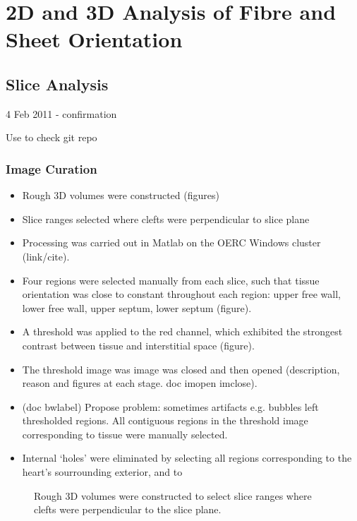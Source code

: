 \chapter{2D and 3D Analysis of Fibre and Sheet Orientation}
\dblspace
\begin{quote}{\em }\end{quote}

\section{Slice Analysis} %
\label{sec:image:slice_analysis}

4 Feb  2011 - confirmation

Use to check git repo

\subsection{Image Curation} %
\label{sub:image_curation}
\begin{itemize}
  \item Rough 3D volumes were constructed (figures)
  \item Slice ranges selected where clefts were perpendicular to slice plane
  \item Processing was carried out in Matlab on the OERC Windows cluster (link/cite).
  \item Four regions were selected manually from each slice, such that tissue orientation was close to constant throughout each region: upper free wall, lower free wall, upper septum, lower septum (figure).
  \item A threshold was applied to the red channel, which exhibited the strongest contrast between tissue and interstitial space (figure).
  \item The threshold image was image was closed and then opened (description, reason and figures at each stage. doc imopen imclose).
  \item (doc bwlabel) Propose problem: sometimes artifacts e.g. bubbles left thresholded regions. All contiguous regions in the threshold image corresponding to tissue were manually selected.
  \item Internal `holes' were eliminated by selecting all regions corresponding to the heart's sourrounding exterior, and to 
  
\end{itemize}

\begin{figure}[htbp]
  \centering
  \caption{Rough 3D volumes were constructed to select slice ranges where clefts were perpendicular to the slice plane.}
  \label{fig:rough_volumes}
\end{figure}

